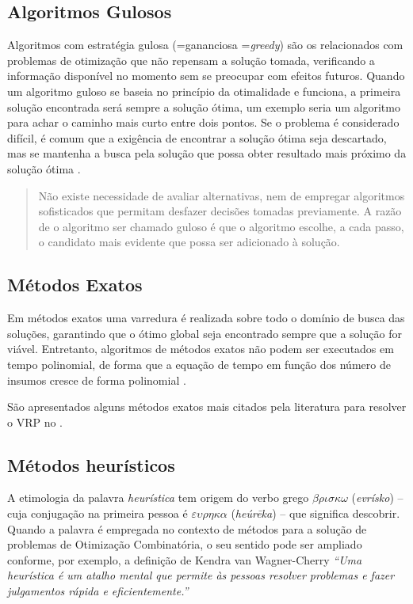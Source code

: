 \subsection{Algoritmos Gulosos}
\label{gulosos}
Algoritmos com estratégia gulosa (=gananciosa =\emph{greedy}) \cite{feofiloff} são os relacionados com problemas de otimização que não repensam a solução tomada, verificando a informação disponível no momento sem se preocupar com efeitos futuros. Quando um algoritmo guloso se baseia no princípio da otimalidade e funciona, a primeira solução encontrada será sempre a solução ótima, um exemplo seria um algoritmo para achar o caminho mais curto entre dois pontos. Se o problema é considerado difícil, é comum que a exigência de encontrar a solução ótima seja descartado, mas se mantenha a busca pela solução que possa obter resultado mais próximo da solução ótima \cite[p. 60]{ziviani}.

\begin{quote}
Não existe necessidade de avaliar alternativas, nem de empregar algoritmos sofisticados que permitam desfazer decisões tomadas previamente. A razão de o algoritmo ser chamado guloso é que o algoritmo escolhe, a cada passo, o candidato mais evidente que possa ser adicionado à solução.
\end{quote}

\subsection{Métodos Exatos} \label{metodos-exatos}

Em métodos exatos uma varredura é realizada sobre todo o domínio de busca das soluções, garantindo que o ótimo global seja encontrado sempre que a solução for viável. Entretanto, algoritmos de métodos exatos não podem ser executados em tempo polinomial, de forma que a equação de tempo em função dos número de insumos cresce de forma polinomial \cite{maxwell}. 

São apresentados alguns métodos exatos mais citados pela literatura para resolver o VRP no .

\subsection{Métodos heurísticos}\label{heuristica}
A etimologia da palavra \emph{heurística} tem origem do verbo grego $\beta \rho \iota \sigma \kappa \omega$
(\emph{evrísko}) -- cuja conjugação na primeira pessoa é  $\varepsilon \upsilon \rho 	\eta \kappa \alpha$ (\emph{heúrēka}) -- que significa descobrir. Quando a palavra é empregada no contexto de métodos para a solução de problemas de Otimização Combinatória, o seu sentido pode ser ampliado conforme, por exemplo, a definição de Kendra van Wagner-Cherry \emph{``Uma heurística é um atalho mental que permite às pessoas resolver problemas e fazer julgamentos rápida e eficientemente.''} \cite{goldbarg}


